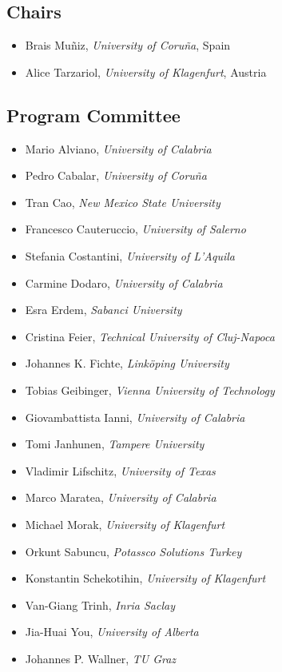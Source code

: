 \documentclass[
]{ceurart}
\begin{document}
\subsection*{Chairs}
\begin{itemize}
 \item Brais Muñiz, \emph{University of Coru\~na}, Spain
 \item Alice Tarzariol, \emph{University of Klagenfurt}, Austria
\end{itemize}


\subsection*{Program Committee}
\begin{itemize}
  \item Mario Alviano, \emph{University of Calabria}
  \item Pedro Cabalar, \emph{University of Coru\~na}
  \item Tran Cao, \emph{New Mexico State University}
  \item Francesco Cauteruccio, \emph{University of Salerno}
  \item Stefania Costantini, \emph{University of L'Aquila}
  \item Carmine Dodaro, \emph{University of Calabria}
  \item Esra Erdem, \emph{Sabanci University}
  \item Cristina Feier, \emph{Technical University of Cluj-Napoca}
  \item Johannes K. Fichte, \emph{Linköping University}
  \item Tobias Geibinger, \emph{Vienna University of Technology}
  \item Giovambattista Ianni, \emph{University of Calabria}
  \item Tomi Janhunen, \emph{Tampere University}
  \item Vladimir Lifschitz, \emph{University of Texas}
  \item Marco Maratea, \emph{University of Calabria}
  \item Michael Morak, \emph{University of Klagenfurt}
  \item Orkunt Sabuncu, \emph{Potassco Solutions Turkey}
  \item Konstantin Schekotihin, \emph{University of Klagenfurt}
  \item Van-Giang Trinh, \emph{Inria Saclay}
  \item Jia-Huai You, \emph{University of Alberta}
  \item Johannes P. Wallner, \emph{TU Graz}
\end{itemize}
\end{document}
